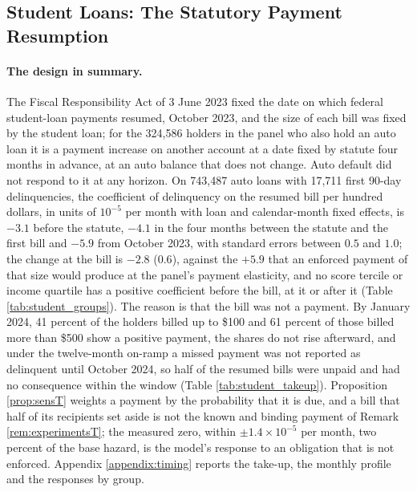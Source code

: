 \subsection{Student Loans: The Statutory Payment Resumption}\label{sec:studentloan}

\paragraph{The design in summary.} The Fiscal Responsibility Act of 3 June 2023 fixed the date on which federal student-loan payments resumed, October 2023, and the size of each bill was fixed by the student loan; for the 324,586 holders in the panel who also hold an auto loan it is a payment increase on another account at a date fixed by statute four months in advance, at an auto balance that does not change. Auto default did not respond to it at any horizon. On 743,487 auto loans with 17,711 first 90-day delinquencies, the coefficient of delinquency on the resumed bill per hundred dollars, in units of $10^{-5}$ per month with loan and calendar-month fixed effects, is $-3.1$ before the statute, $-4.1$ in the four months between the statute and the first bill and $-5.9$ from October 2023, with standard errors between $0.5$ and $1.0$; the change at the bill is $-2.8$ ($0.6$), against the $+5.9$ that an enforced payment of that size would produce at the panel's payment elasticity, and no score tercile or income quartile has a positive coefficient before the bill, at it or after it (Table \ref{tab:student_groups}). The reason is that the bill was not a payment. By January 2024, 41 percent of the holders billed up to \$100 and 61 percent of those billed more than \$500 show a positive payment, the shares do not rise afterward, and under the twelve-month on-ramp a missed payment was not reported as delinquent until October 2024, so half of the resumed bills were unpaid and had no consequence within the window (Table \ref{tab:student_takeup}). Proposition \ref{prop:sensT} weights a payment by the probability that it is due, and a bill that half of its recipients set aside is not the known and binding payment of Remark \ref{rem:experimentsT}; the measured zero, within $\pm 1.4 \times 10^{-5}$ per month, two percent of the base hazard, is the model's response to an obligation that is not enforced. Appendix \ref{appendix:timing} reports the take-up, the monthly profile and the responses by group.

